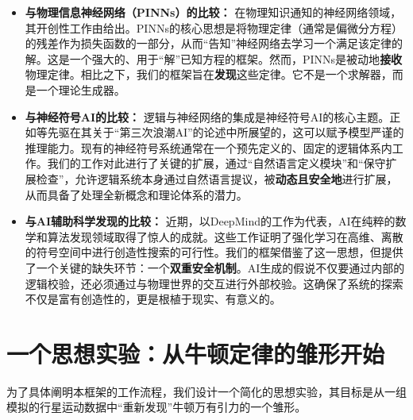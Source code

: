 \documentclass[11pt, a4paper]{article}
\begin{document}
\begin{itemize}
	\item \textbf{与物理信息神经网络（PINNs）的比较：}
	在物理知识通知的神经网络领域，其开创性工作由\citet{raissi2019pinns}给出。PINNs的核心思想是将物理定律（通常是偏微分方程）的残差作为损失函数的一部分，从而“告知”神经网络去学习一个满足该定律的解。这是一个强大的、用于“解”已知方程的框架。然而，PINNs是被动地\textbf{接收}物理定律。相比之下，我们的框架旨在\textbf{发现}这些定律。它不是一个求解器，而是一个理论生成器。
	
	\item \textbf{与神经符号AI的比较：}
	逻辑与神经网络的集成是神经符号AI的核心主题。正如\citet{garcez2019neural}等先驱在其关于“第三次浪潮AI”的论述中所展望的，这可以赋予模型严谨的推理能力。现有的神经符号系统通常在一个预先定义的、固定的逻辑体系内工作。我们的工作对此进行了关键的扩展，通过“自然语言定义模块”和“保守扩展检查”，允许逻辑系统本身通过自然语言提议，被\textbf{动态且安全地}进行扩展，从而具备了处理全新概念和理论体系的潜力。
	
	\item \textbf{与AI辅助科学发现的比较：}
	近期，以DeepMind的工作为代表，AI在纯粹的数学和算法发现领域取得了惊人的成就\citep{fawzi2022discovering}。这些工作证明了强化学习在高维、离散的符号空间中进行创造性搜索的可行性。我们的框架借鉴了这一思想，但提供了一个关键的缺失环节：一个\textbf{双重安全机制}。AI生成的假说不仅要通过内部的逻辑校验，还必须通过与物理世界的交互进行外部校验。这确保了系统的探索不仅是富有创造性的，更是根植于现实、有意义的。
\end{itemize}


\section{一个思想实验：从牛顿定律的雏形开始}

为了具体阐明本框架的工作流程，我们设计一个简化的思想实验，其目标是从一组模拟的行星运动数据中“重新发现”牛顿万有引力的一个雏形。
\end{document}
